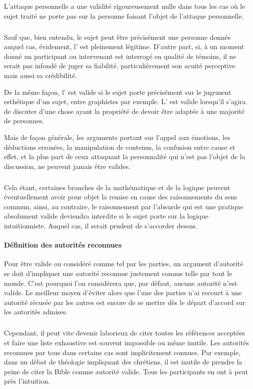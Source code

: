 L’attaque personnelle a une validité rigoureusement nulle dans tous les cas où le sujet traité ne porte pas sur la personne faisant l’objet de l’attaque personnelle.

\subparagraph{}
Sauf que, bien entendu, le sujet peut être précisément une personne donnée auquel cas, évidement, l’ est pleinement légitime. D’autre part, si, à un moment donné un participant ou intervenant est interrogé en qualité de témoins, il ne serait pas infondé de juger sa fiabilité, particulièrement son acuité perceptive mais aussi sa crédibilité.

De la même façon, l’ est valide si le sujet porte précisément sur le jugement esthétique d’un sujet, entre graphistes par exemple. L’ est valide lorsqu’il s’agira de discuter d’une chose ayant la propriété de devoir être adaptée à une majorité de personnes.

Mais de façon générale, les arguments portant sur l’appel aux émotions, les déductions erronées, la manipulation de contenus, la confusion entre cause et effet, et la plus part de ceux attaquant la personnalité qui n’est pas l’objet de la discussion, ne peuvent jamais être valides.

\subparagraph{}
Cela étant, certaines branches de la mathématique et de la logique peuvent éventuellement avoir pour objet la remise en cause des raisonnements du sens commun, ainsi, au contraire, le raisonnement par l’absurde qui est une pratique absolument valide deviendra interdite si le sujet porte sur la logique intuitionniste. Auquel cas, il serait prudent de s’accorder dessus.

\paragraph{Définition des autorités reconnues} Pour être valide ou considéré comme tel par les parties, un argument d’autorité se doit d’impliquer une autorité reconnue justement comme telle par tout le monde. C’est pourquoi l’on considérera que, par défaut, aucune autorité n’est valide. Le meilleur moyen d’éviter alors que l’une des parties n’ai recourt à une autorité récusée par les autres est encore de se mettre dès le départ d’accord sur les autorités admises.

\subparagraph{}
Cependant, il peut vite devenir laborieux de citer toutes les références acceptées et faire une liste exhaustive est souvent impossible ou même inutile. Les autorités reconnues par tous dans certains cas sont implicitement connues. Par exemple, dans un débat de théologie impliquant des chrétiens, il est inutile de prendre la peine de citer la Bible comme autorité valide. Tous les participants en ont à peut près l’intuition.

